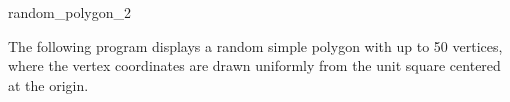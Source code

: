 \begin{ccRefFunction}{random_polygon_2}
\ccExample

The following program displays a random simple polygon with up to 50
vertices, where the vertex coordinates are drawn uniformly from the 
unit square centered at the origin.


\end{ccRefFunction}
